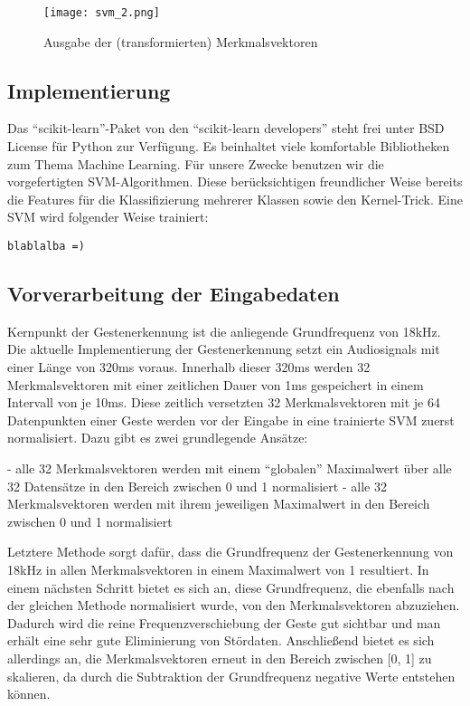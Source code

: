 \begin{figure}[h!]
  \centering
    \texttt{[image: svm\_2.png]}
  \caption{Ausgabe der (transformierten) Merkmalsvektoren}
\end{figure}

\subsection{Implementierung}

Das “scikit-learn”-Paket von den “scikit-learn developers” steht frei unter BSD License für Python zur Verfügung. Es beinhaltet viele komfortable Bibliotheken zum Thema Machine Learning. Für unsere Zwecke benutzen wir die vorgefertigten SVM-Algorithmen. Diese berücksichtigen freundlicher Weise bereits die Features für die Klassifizierung mehrerer Klassen sowie den Kernel-Trick. Eine SVM wird folgender Weise trainiert:

\begin{lstlisting}
blablalba =)
\end{lstlisting}


\subsection{Vorverarbeitung der Eingabedaten}

Kernpunkt der Gestenerkennung ist die anliegende Grundfrequenz von 18kHz. Die aktuelle Implementierung der Gestenerkennung setzt ein Audiosignals mit einer Länge von 320ms voraus. Innerhalb dieser 320ms werden 32 Merkmalsvektoren mit einer zeitlichen Dauer von 1ms gespeichert in einem Intervall von je 10ms. Diese zeitlich versetzten 32 Merkmalsvektoren mit je 64 Datenpunkten einer Geste werden vor der Eingabe in eine trainierte SVM zuerst normalisiert. Dazu gibt es zwei grundlegende Ansätze:

- alle 32 Merkmalsvektoren werden mit einem “globalen” Maximalwert über alle 32 Datensätze in den Bereich zwischen 0 und 1 normalisiert\newline
- alle 32 Merkmalsvektoren werden mit ihrem jeweiligen Maximalwert in den Bereich zwischen 0 und 1 normalisiert

Letztere Methode sorgt dafür, dass die Grundfrequenz der Gestenerkennung von 18kHz in allen Merkmalsvektoren in einem Maximalwert von 1 resultiert. In einem nächsten Schritt bietet es sich an, diese Grundfrequenz, die ebenfalls nach der gleichen Methode normalisiert wurde, von den Merkmalsvektoren abzuziehen. Dadurch wird die reine Frequenzverschiebung der Geste gut sichtbar und man erhält eine sehr gute Eliminierung von Stördaten. Anschließend bietet es sich allerdings an, die Merkmalsvektoren erneut in den Bereich zwischen [0, 1] zu skalieren, da durch die Subtraktion der Grundfrequenz negative Werte entstehen können.


